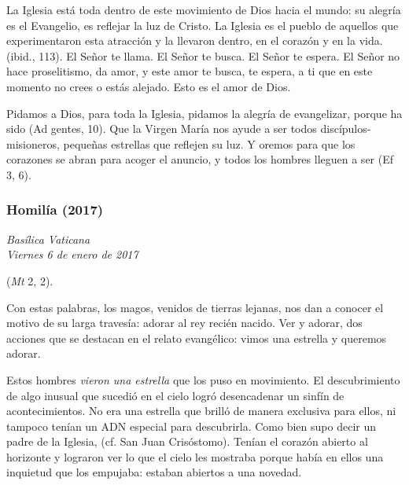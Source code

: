 {La Iglesia está toda dentro de este movimiento de Dios hacia el mundo: su alegría es el Evangelio, es reflejar la luz de Cristo. La Iglesia es el pueblo de aquellos que experimentaron esta atracción y la llevaron dentro, en el corazón y en la vida.  (ibid., 113). El Señor te llama. El Señor te busca. El Señor te espera. El Señor no hace proselitismo, da amor, y este amor te busca, te espera, a ti que en este momento no crees o estás alejado. Esto es el amor de Dios.

Pidamos a Dios, para toda la Iglesia, pidamos la alegría de evangelizar, porque ha sido  (Ad gentes, 10). Que la Virgen María nos ayude a ser todos discípulos-misioneros, pequeñas estrellas que reflejen su luz. Y oremos para que los corazones se abran para acoger el anuncio, y todos los hombres lleguen a ser  (Ef 3, 6).

\subsubsection{Homilía (2017)}

\emph{Basílica Vaticana\\ Viernes 6 de enero de 2017}


 (\emph{Mt} 2, 2).

Con estas palabras, los magos, venidos de tierras lejanas, nos dan a conocer el motivo de su larga travesía: adorar al rey recién nacido. Ver y adorar, dos acciones que se destacan en el relato evangélico: vimos una estrella y queremos adorar.

Estos hombres \emph{vieron una estrella} que los puso en movimiento. El descubrimiento de algo inusual que sucedió en el cielo logró desencadenar un sinfín de acontecimientos. No era una estrella que brilló de manera exclusiva para ellos, ni tampoco tenían un ADN especial para descubrirla. Como bien supo decir un padre de la Iglesia,  (cf. San Juan Crisóstomo). Tenían el corazón abierto al horizonte y lograron ver lo que el cielo les mostraba porque había en ellos una inquietud que los empujaba: estaban abiertos a una novedad.

}
